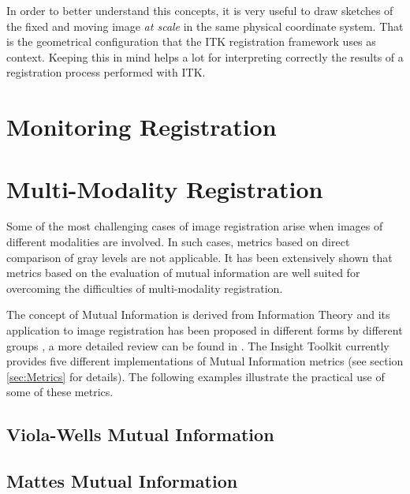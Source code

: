 In order to better understand this concepts, it is very useful to draw sketches
of the fixed and moving image {\em at scale} in the same physical coordinate
system. That is the geometrical configuration that the ITK registration
framework uses as context. Keeping this in mind helps a lot for interpreting
correctly the results of a registration process performed with ITK.

\section{Monitoring Registration}
\label{sec:MonitoringImageRegistration}
\ifitkFullVersion

\fi



\section{Multi-Modality Registration}
\label{sec:MultiModalityRegistration}

Some of the most challenging cases of image registration arise when images of
different modalities are involved. In such cases, metrics based on direct
comparison of gray levels are not applicable. It has been extensively shown
that metrics based on the evaluation of mutual information are well suited for
overcoming the difficulties of multi-modality registration.


The concept of Mutual Information is derived from Information Theory and its
application to image registration has been proposed in different forms by
different groups \cite{Collignon1995,Maes97,Viola1997}, a more detailed review
can be found in \cite{Hajnal2001,Pluim2003}. The Insight Toolkit currently
provides five different implementations of Mutual Information metrics (see
section \ref{sec:Metrics} for details). The following examples illustrate the
practical use of some of these metrics.

\subsection{Viola-Wells Mutual Information}
\label{sec:MultiModalityRegistrationViolaWells}
\ifitkFullVersion

\fi

\subsection{Mattes Mutual Information}
\label{sec:MultiModalityRegistrationMattes}
\ifitkFullVersion

\fi



